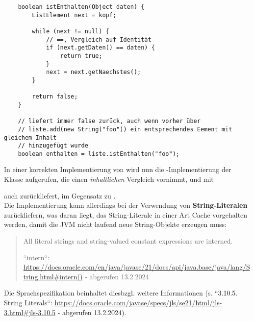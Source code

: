 \begin{verbatim}
    boolean istEnthalten(Object daten) {
        ListElement next = kopf;

        while (next != null) {
            // ==, Vergleich auf Identität
            if (next.getDaten() == daten) {
                return true;
            }
            next = next.getNaechstes();
        }

        return false;
    }

    // liefert immer false zurück, auch wenn vorher über
    // liste.add(new String("foo")) ein entsprechendes Eement mit gleichem Inhalt
    // hinzugefügt wurde
    boolean enthalten = liste.istEnthalten("foo");
\end{verbatim}

In einer korrekten Implementierung von  wird nun die -Implementierung der Klasse  aufgerufen, die einen \textit{inhaltlichen} Vergleich vornimmt, und mit \begin{center}\end{center} auch  zurückliefert, im Gegensatz zu .\\
Die Implementierung kann allerdings bei der Verwendung von \textbf{String-Literalen}   zurückliefern, was daran liegt, das String-Literale in einer Art Cache vorgehalten werden, damit die JVM nicht laufend neue String-Objekte erzeugen muss:

\blockquote[{``intern``: \url{https://docs.oracle.com/en/java/javase/21/docs/api/java.base/java/lang/String.html#intern()} - abgerufen 13.2.2024}]{
    All literal strings and string-valued constant expressions are interned.
 }

\noindent
Die Sprachspezifikation beinhaltet diesbzgl. weitere Informationen (s. ``3.10.5. String Literals``: \url{https://docs.oracle.com/javase/specs/jls/se21/html/jls-3.html#jls-3.10.5} - abgerufen 13.2.2024).